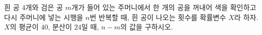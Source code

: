 흰 공 4개와 검은 공 $m$개가 들어 있는 주머니에서 한 개의 공을 꺼내어 색을 확인하고 다시 주머니에 넣는 시행을 $n$번 반복할 때, 흰 공이 나오는 횟수를 확률변수 $X$라 하자. $X$의 평균이 $40$, 분산이 $24$일 때, $n-m$의 값을 구하시오.
